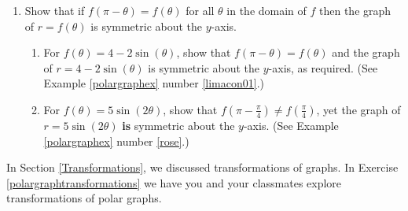 \documentclass{ximera}
\begin{document}
\begin{enumerate}
\begin{enumerate}
\end{enumerate}

\newpage

\item  Show that if $ f(\pi-\theta)=f(\theta)$ for all $\theta$ in the domain of $f$ then the graph of $r = f(\theta)$ is symmetric about the $y$-axis. \label{sympolarlast}

\begin{enumerate}

\item  For $f(\theta) = 4-2\sin(\theta)$, show that $f(\pi - \theta) = f(\theta)$ and the graph of $r = 4-2\sin(\theta)$ is symmetric about the $y$-axis, as required.  (See Example \ref{polargraphex} number \ref{limacon01}.)

\item  For $f(\theta) = 5\sin(2\theta)$, show that $f\left(\pi - \frac{\pi}{4} \right) \neq  f\left(  \frac{\pi}{4} \right)$,  yet the graph of $r = 5\sin(2\theta)$ \textbf{is} symmetric about the $y$-axis.  (See  Example \ref{polargraphex} number  \ref{rose}.)

\end{enumerate}

\setcounter{HW}{\value{enumi}}

\end{enumerate}

In Section \ref{Transformations}, we discussed transformations of graphs.   In Exercise \ref{polargraphtransformations} we have you and your classmates explore transformations of polar graphs. 
\end{document}
